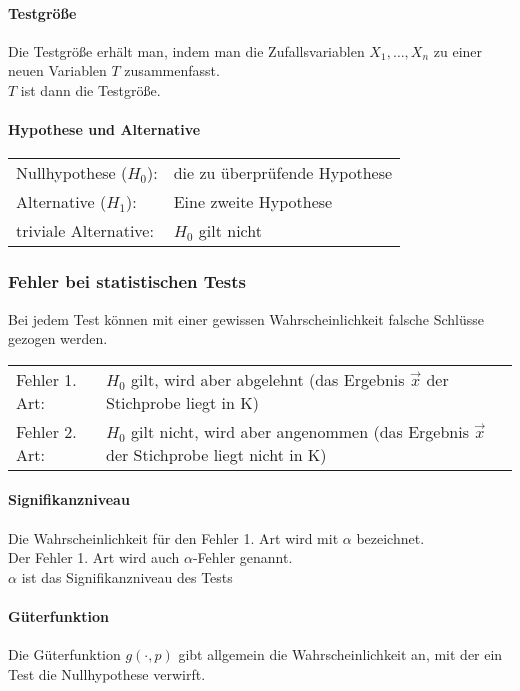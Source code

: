 \documentclass[a4paper,9pt]{extarticle}
\begin{document}
\paragraph*{Testgröße}
Die Testgröße erhält man, indem man die Zufallsvariablen $X_1, \dots, X_n$ zu einer neuen Variablen $T$ zusammenfasst. \\
$T$ ist dann die Testgröße.

\paragraph*{Hypothese und Alternative}
\begin{tabular}{ll}
	Nullhypothese ($H_0$): & die zu überprüfende Hypothese \\
	Alternative ($H_1$): & Eine zweite Hypothese \\
	triviale Alternative: & $H_0$ gilt nicht
\end{tabular}

\subsubsection*{Fehler bei statistischen Tests}
Bei jedem Test können mit einer gewissen Wahrscheinlichkeit falsche Schlüsse gezogen werden. \\
\begin{tabularx}{\columnwidth}{lX}
	Fehler 1. Art: & $H_0$ gilt, wird aber abgelehnt (das Ergebnis $\vec{x}$ der Stichprobe liegt in K)\\
	Fehler 2. Art: & $H_0$ gilt nicht, wird aber angenommen  (das Ergebnis $\vec{x}$ der Stichprobe liegt nicht in K)
\end{tabularx}

\paragraph*{Signifikanzniveau}
Die Wahrscheinlichkeit für den Fehler 1. Art wird mit $\alpha$ bezeichnet. \\
Der Fehler 1. Art wird auch $\alpha$-Fehler genannt. \\
$\alpha$ ist das Signifikanzniveau des Tests \\

\paragraph*{Güterfunktion}
Die Güterfunktion $g(⋅, p)$ gibt allgemein die Wahrscheinlichkeit an, mit der ein Test die Nullhypothese verwirft.
\end{document}
